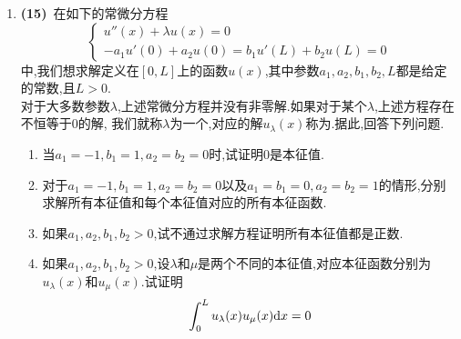 \documentclass{ctexart}
\begin{document}
\begin{enumerate}[leftmargin=*,label=\textbf{\arabic*.}]
    \item \textbf{(15)}\ 在如下的常微分方程
    \[\left\{\begin{array}{l}
        u''(x)+\lambda u(x)=0\\
        -a_1u'(0)+a_2u(0)=b_1u'(L)+b_2u(L)=0
    \end{array}\right.\]
    中,我们想求解定义在$[0,L]$上的函数$u(x)$,其中参数$a_1,a_2,b_1,b_2,L$都是给定的常数,且$L>0$.\\
    对于大多数参数$\lambda$,上述常微分方程并没有非零解.如果对于某个$\lambda$,上述方程存在不恒等于$0$的解,%
    我们就称$\lambda$为一个,对应的解$u_\lambda(x)$称为.据此,回答下列问题.
    \begin{enumerate}[label=\tbf{(\arabic*)}]
        \item 当$a_1=-1,b_1=1,a_2=b_2=0$时,试证明$0$是本征值.
        \item 对于$a_1=-1,b_1=1,a_2=b_2=0$以及$a_1=b_1=0,a_2=b_2=1$的情形,分别求解所有本征值和每个本征值对应的所有本征函数.
        \item 如果$a_1,a_2,b_1,b_2>0$,试不通过求解方程证明所有本征值都是正数.
        \item 如果$a_1,a_2,b_1,b_2>0$,设$\lambda$和$\mu$是两个不同的本征值,对应本征函数分别为$u_\lambda(x)$和$u_\mu(x)$.试证明
            \[\int_0^Lu_\lambda(x)u_\mu(x)\mathrm{d} x=0\]

    \end{enumerate}

\end{enumerate}
\end{document}
